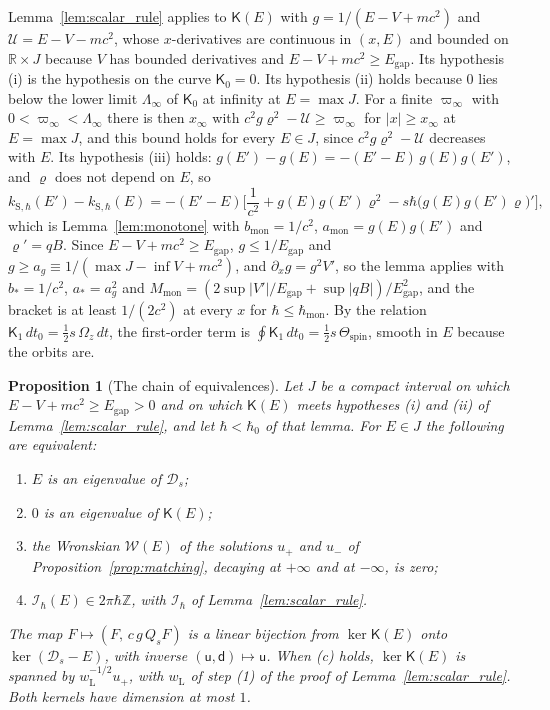 \documentclass[aps,prd,onecolumn,tightenlines,nofootinbib,notitlepage,11pt,floatfix]{revtex4-2}
\theoremstyle{indentedtheorem}
\newtheorem{proposition}{Proposition}
\begin{document}
Lemma~\ref{lem:scalar_rule} applies to $\mathsf{K}(E)$ with $g=1/(E-V+mc^2)$ and $\mathcal{U}=E-V-mc^2$, whose $x$-derivatives are continuous in $(x,E)$ and bounded on $\mathbb{R}\times J$ because $V$ has bounded derivatives and $E-V+mc^2\geq E_\text{gap}$. Its hypothesis (i) is the hypothesis on the curve $\mathsf{K}_0=0$. Its hypothesis (ii) holds because $0$ lies below the lower limit $\Lambda_\infty$ of $\mathsf{K}_0$ at infinity at $E=\max J$. For a finite $\varpi_\infty$ with $0<\varpi_\infty<\Lambda_\infty$ there is then $x_\infty$ with $c^2g\varrho^2-\mathcal{U}\geq\varpi_\infty$ for $|x|\geq x_\infty$ at $E=\max J$, and this bound holds for every $E\in J$, since $c^2g\varrho^2-\mathcal{U}$ decreases with $E$. Its hypothesis (iii) holds: $g(E')-g(E)=-(E'-E)\,g(E)g(E')$, and $\varrho$ does not depend on $E$, so
\begin{equation*}
    k_{\text{S},\hbar}(E')-k_{\text{S},\hbar}(E) = -(E'-E)\Big[\frac{1}{c^2}+g(E)g(E')\varrho^2-s\hbar\big(g(E)g(E')\varrho\big)'\Big] ,
\end{equation*}
which is Lemma~\ref{lem:monotone} with $b_\text{mon}=1/c^2$, $a_\text{mon}=g(E)g(E')$ and $\varrho'=qB$. Since $E-V+mc^2\geq E_\text{gap}$, $g\leq1/E_\text{gap}$ and $g\geq a_g\equiv1/(\max J-\inf V+mc^2)$, and $\partial_xg=g^2V'$, so the lemma applies with $b_*=1/c^2$, $a_*=a_g^2$ and $M_\text{mon}=(2\sup|V'|/E_\text{gap}+\sup|qB|)/E_\text{gap}^2$, and the bracket is at least $1/(2c^2)$ at every $x$ for $\hbar\leq\hbar_\text{mon}$. By the relation $\mathsf{K}_1\,dt_0=\tfrac{1}{2}s\,\Omega_z\,dt$, the first-order term is $\oint\mathsf{K}_1\,dt_0=\tfrac{1}{2}s\,\Theta_\text{spin}$, smooth in $E$ because the orbits are.

\begin{proposition}[The chain of equivalences]\label{prop:chain}
Let $J$ be a compact interval on which $E-V+mc^2\geq E_\text{gap}>0$ and on which $\mathsf{K}(E)$ meets hypotheses (i) and (ii) of Lemma~\ref{lem:scalar_rule}, and let $\hbar<\hbar_0$ of that lemma. For $E\in J$ the following are equivalent:
\begin{enumerate}
\item[(a)] $E$ is an eigenvalue of $\mathcal{D}_s$;
\item[(b)] $0$ is an eigenvalue of $\mathsf{K}(E)$;
\item[(c)] the Wronskian $\mathcal{W}(E)$ of the solutions $u_+$ and $u_-$ of Proposition~\ref{prop:matching}, decaying at $+\infty$ and at $-\infty$, is zero;
\item[(d)] $\mathcal{I}_\hbar(E)\in2\pi\hbar\mathbb{Z}$, with $\mathcal{I}_\hbar$ of Lemma~\ref{lem:scalar_rule}.
\end{enumerate}
The map $F\mapsto(F,\,c\,g\,Q_sF)$ is a linear bijection from $\ker\mathsf{K}(E)$ onto $\ker(\mathcal{D}_s-E)$, with inverse $(\mathsf{u},\mathsf{d})\mapsto\mathsf{u}$. When (c) holds, $\ker\mathsf{K}(E)$ is spanned by $w_\text{L}^{-1/2}u_+$, with $w_\text{L}$ of step (1) of the proof of Lemma~\ref{lem:scalar_rule}. Both kernels have dimension at most $1$.
\end{proposition}
\end{document}
